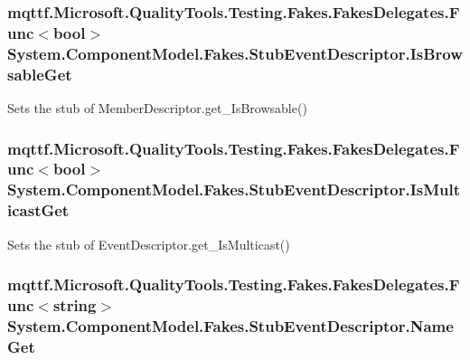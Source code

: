 \hypertarget{class_system_1_1_component_model_1_1_fakes_1_1_stub_event_descriptor_a36a7b1c0a165425c6cf74dee629c5a14}{
\subsubsection[{Is\-Browsable\-Get}]{\setlength{\rightskip}{0pt plus 5cm}mqttf.\-Microsoft.\-Quality\-Tools.\-Testing.\-Fakes.\-Fakes\-Delegates.\-Func$<$bool$>$ System.\-Component\-Model.\-Fakes.\-Stub\-Event\-Descriptor.\-Is\-Browsable\-Get}}\label{class_system_1_1_component_model_1_1_fakes_1_1_stub_event_descriptor_a36a7b1c0a165425c6cf74dee629c5a14}


Sets the stub of Member\-Descriptor.\-get\-\_\-\-Is\-Browsable()

\hypertarget{class_system_1_1_component_model_1_1_fakes_1_1_stub_event_descriptor_a47e3994bafdf2954e94ee61f7f1b0feb}{
\subsubsection[{Is\-Multicast\-Get}]{\setlength{\rightskip}{0pt plus 5cm}mqttf.\-Microsoft.\-Quality\-Tools.\-Testing.\-Fakes.\-Fakes\-Delegates.\-Func$<$bool$>$ System.\-Component\-Model.\-Fakes.\-Stub\-Event\-Descriptor.\-Is\-Multicast\-Get}}\label{class_system_1_1_component_model_1_1_fakes_1_1_stub_event_descriptor_a47e3994bafdf2954e94ee61f7f1b0feb}


Sets the stub of Event\-Descriptor.\-get\-\_\-\-Is\-Multicast()

\hypertarget{class_system_1_1_component_model_1_1_fakes_1_1_stub_event_descriptor_a3e077c43857b9dd2b95f430bd2ce56cb}{
\subsubsection[{Name\-Get}]{\setlength{\rightskip}{0pt plus 5cm}mqttf.\-Microsoft.\-Quality\-Tools.\-Testing.\-Fakes.\-Fakes\-Delegates.\-Func$<$string$>$ System.\-Component\-Model.\-Fakes.\-Stub\-Event\-Descriptor.\-Name\-Get}}\label{class_system_1_1_component_model_1_1_fakes_1_1_stub_event_descriptor_a3e077c43857b9dd2b95f430bd2ce56cb}


